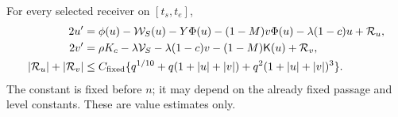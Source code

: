\documentclass[11pt]{article}
\numberwithin{equation}{section}
\theoremstyle{remark}\newtheorem{remark}[theorem]{Remark}
\newcommand{\Kfun}{\mathsf K}\newcommand{\Ffun}{\mathsf F}
\begin{document}
\begin{proposition}
\label{an03wcsv1:reduction}
For every selected receiver on $[t_s,t_e]$,
\begin{align}
 2u'&=\phi(u)-\mathcal W_S(u)-Y\Phi(u)
       -(1-M)v\Phi(u)-\lambda(1-c)u+\mathcal R_u,\notag\\
 2v'&=\rho K_c-\lambda\mathcal V_S-\lambda(1-c)v
                         -(1-M)\Kfun(u)+\mathcal R_v,
 \label{an03wcsv1:leading}\\
 |\mathcal R_u|+|\mathcal R_v|
 &\le C_{\rm fixed}\{q^{1/10}+q(1+|u|+|v|)
                              +q^2(1+|u|+|v|)^3\}.
 \label{an03wcsv1:Rgrowth}
\end{align}
The constant is fixed before $n$; it may depend on the already fixed
passage and level constants. These are value estimates only.
\end{proposition}
\end{document}
